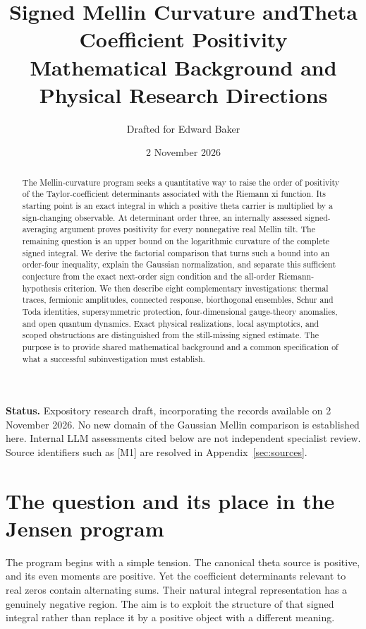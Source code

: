 \documentclass[11pt,letterpaper]{article}
\title{Signed Mellin Curvature and\newline Theta Coefficient Positivity\\[5pt]
\large Mathematical Background and Physical Research Directions}
\author{Drafted for Edward Baker}
\date{2 November 2026}
\numberwithin{equation}{section}
\theoremstyle{remark}
\newcommand{\evid}[1]{\textsf{[#1]}}
\begin{document}
\maketitle
\begin{abstract}
The Mellin-curvature program seeks a quantitative way to raise the order
of positivity of the Taylor-coefficient determinants associated with the
Riemann xi function. Its starting point is an exact integral in which a
positive theta carrier is multiplied by a sign-changing observable.
At determinant order three, an internally assessed signed-averaging
argument proves positivity for every nonnegative real Mellin tilt. The
remaining question is an upper bound on the logarithmic curvature of the
complete signed integral. We derive the factorial comparison that turns
such a bound into an order-four inequality, explain the Gaussian
normalization, and separate this sufficient conjecture from the exact
next-order sign condition and the all-order Riemann-hypothesis criterion.
We then describe eight complementary investigations: thermal traces,
fermionic amplitudes, connected response, biorthogonal ensembles,
Schur and Toda identities, supersymmetric protection, four-dimensional
gauge-theory anomalies, and open quantum dynamics. Exact physical
realizations, local asymptotics, and scoped obstructions are distinguished
from the still-missing signed estimate. The purpose is to provide shared
mathematical background and a common specification of what a successful
subinvestigation must establish.
\end{abstract}

\noindent\textbf{Status.} Expository research draft, incorporating the records
available on 2 November 2026. No new domain of the Gaussian Mellin
comparison is established here. Internal LLM assessments cited below are
not independent specialist review. Source identifiers such as \evid{M1}
are resolved in Appendix~\ref{sec:sources}.

\tableofcontents
\clearpage

\section{The question and its place in the Jensen program}
\label{sec:question}

The program begins with a simple tension. The canonical theta source is
positive, and its even moments are positive. Yet the coefficient
determinants relevant to real zeros contain alternating sums. Their
natural integral representation has a genuinely negative region. The
aim is to exploit the structure of that signed integral rather than
replace it by a positive object with a different meaning.
\end{document}
